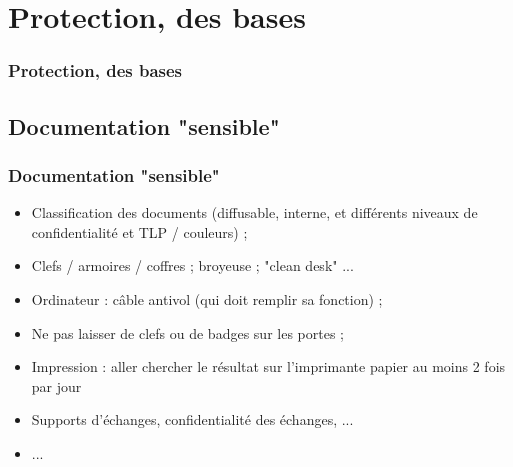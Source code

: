 \documentclass[slidetop,11pt]{beamer}
\begin{document}
\section{Protection, des bases}
\begin{frame}
	\frametitle{Protection, des bases}
	\tableofcontents[sections=3,currentsection,subsectionstyle=show/shaded/hide] %
\end{frame}

\subsection{Documentation "sensible"}
\begin{frame}
	\frametitle{Documentation "sensible"}
	\begin{itemize}
		\item Classification des documents (diffusable, interne, et diff{\'e}rents niveaux de confidentialit{\'e} et TLP / couleurs) ; 
		\item Clefs / armoires / coffres ; broyeuse ; "clean desk" ... 
		\item Ordinateur : c{\^a}ble antivol (qui doit remplir sa fonction) ; 
		\item Ne pas laisser de clefs ou de badges sur les portes ; 
		\item Impression : aller chercher le r{\'e}sultat sur l'imprimante papier au moins 2 fois par jour
		\item Supports d'{\'e}changes, confidentialit{\'e} des {\'e}changes, ... 
		\item ... 
	\end{itemize}
\end{frame}
\end{document}
